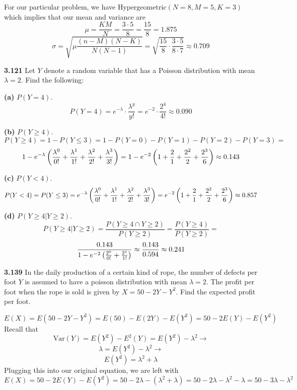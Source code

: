 \documentclass{exam}
\begin{document}
\begin{questions}
For our particular problem, we have $\text{Hypergeometric}(N = 8, M = 5, K = 3)$ which implies that our mean and variance are
$$\mu = \frac{KM}{N} = \frac{3 \cdot 5}{8} = \frac{15}{8} = 1.875$$
$$\sigma = \sqrt{\mu\frac{(n - M)(N - K)}{N(N - 1)}} = \sqrt{\frac{15}{8} \cdot \frac{3 \cdot 5}{8 \cdot 7}} \approx 0.709$$

\newpage
\textbf{3.121 }
Let $Y$ denote a random variable that has a Poisson distribution with mean $\lambda = 2$. Find the following:

\newline
\textbf{(a) } $P(Y = 4)$.
\sol
$$P(Y = 4) = e^{-\lambda} \cdot \frac{\lambda^y}{y!} = e^{-2} \cdot \frac{2^4}{4!} \approx 0.090$$

\newline
\textbf{(b) } $P(Y \geq 4)$.
\sol
$$P(Y \geq 4) = 1 - P(Y \leq 3) = 1 - P(Y = 0) - P(Y = 1) - P(Y = 2) - P(Y = 3) =$$
$$1 - e^{-\lambda} \left( \frac{\lambda^0}{0!} + \frac{\lambda^1}{1!} + \frac{\lambda^2}{2!} + \frac{\lambda^3}{3!} \right) = 1 - e^{-2} \left( 1 + \frac{2}{1} + \frac{2^2}{2} + \frac{2^3}{6} \right) \approx 0.143$$

\newline
\textbf{(c) } $P(Y < 4)$.
\sol
$$P(Y < 4) = P(Y \leq 3) = e^{-\lambda} \left( \frac{\lambda^0}{0!} + \frac{\lambda^1}{1!} + \frac{\lambda^2}{2!} + \frac{\lambda^3}{3!} \right) = e^{-2} \left( 1 + \frac{2}{1} + \frac{2^2}{2} + \frac{2^3}{6} \right) \approx 0.857$$

\newline
\textbf{(d) } $P(Y \geq 4 | Y \geq 2)$.
\sol
$$P(Y \geq 4 | Y \geq 2) = \frac{P(Y \geq 4 \cap Y \geq 2)}{P(Y \geq 2)} = \frac{P(Y \geq 4)}{P(Y \geq 2)} =$$
$$\frac{0.143}{1 - e^{-2}\left( \frac{2^0}{0!} + \frac{2^1}{1!} \right)} \approx \frac{0.143}{0.594} \approx 0.241$$

\newpage
\textbf{3.139 }
In the daily production of a certain kind of rope, the number of defects per foot $Y$ is assumed to have a poisson distribution with mean $\lambda = 2$. The profit per foot when the rope is sold is given by $X = 50 - 2Y - Y^2$. Find the expected profit per foot.

\sol
$$E(X) = E(50 - 2Y - Y^2) = E(50) - E(2Y) - E(Y^2) = 50 - 2E(Y) - E(Y^2)$$
Recall that 
$$\text{Var}(Y) = E(Y^2) - E^2(Y) = E(Y^2) - \lambda^2 \longrightarrow$$
$$\lambda = E(Y^2) - \lambda^2 \longrightarrow$$
$$E(Y^2) = \lambda^2 + \lambda$$
Plugging this into our original equation, we are left with
$$E(X) = 50 - 2E(Y) - E(Y^2) = 50 - 2\lambda - (\lambda^2 + \lambda) = 50 - 2\lambda - \lambda^2 - \lambda = 50 - 3\lambda - \lambda^2$$


\end{questions}
\end{document}
